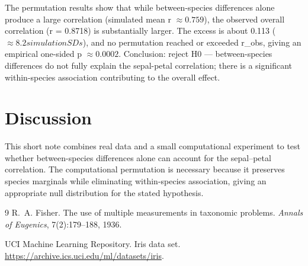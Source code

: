 \documentclass[11pt]{article}
\begin{document}
The permutation results show that while between-species differences alone produce a large correlation (simulated mean r \(\approx 0.759\)), 
the observed overall correlation (r = 0.8718) is substantially larger. The excess is about 0.113 ( \(\approx 8.2 simulation SDs\)), 
and no permutation reached or exceeded r\_obs, giving an empirical one-sided p \(\approx 0.0002\). Conclusion: reject H0 — between-species differences 
do not fully explain the sepal-petal correlation; there is a significant within-species association contributing to the overall effect.

\section{Discussion}
This short note combines real data and a small computational experiment
to test whether between-species differences alone can account for the
sepal--petal correlation. The computational permutation is necessary
because it preserves species marginals while eliminating within-species
association, giving an appropriate null distribution for the stated
hypothesis.

\begin{thebibliography}{9}
R.~A. Fisher.
\newblock The use of multiple measurements in taxonomic problems.
\newblock \emph{Annals of Eugenics}, 7(2):179--188, 1936.

UCI Machine Learning Repository.
\newblock Iris data set.
\newblock \url{https://archive.ics.uci.edu/ml/datasets/iris}.
\end{thebibliography}
\end{document}
